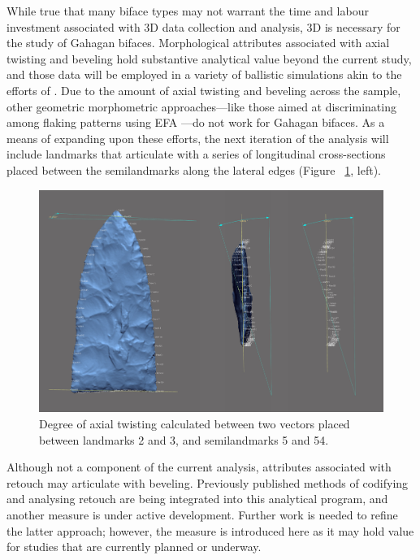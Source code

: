 \documentclass[review]{elsarticle}
\begin{document}
While true that many biface types may not warrant the time and labour investment associated with 3D data collection and analysis, 3D is necessary for the study of Gahagan bifaces. Morphological attributes associated with axial twisting and beveling hold substantive analytical value beyond the current study, and those data will be employed in a variety of ballistic simulations akin to the efforts of \citet{RN20857}. Due to the amount of axial twisting and beveling across the sample, other geometric morphometric approaches---like those aimed at discriminating among flaking patterns using EFA  \citep{RN253,RN4143,RN11975}---do not work for Gahagan bifaces. As a means of expanding upon these efforts, the next iteration of the analysis will include landmarks that articulate with a series of longitudinal cross-sections placed between the semilandmarks along the lateral edges (Figure ~\ref{fig:beveling}, left).

\begin{figure}[h]\centering
\includegraphics[width=\linewidth]{gahagan-beveling.pdf}
\caption{Degree of axial twisting calculated between two vectors placed between landmarks 2 and 3, and semilandmarks 5 and 54.}
\label{fig:beveling}
\end{figure}

Although not a component of the current analysis, attributes associated with retouch may articulate with beveling. Previously published methods of codifying and analysing retouch \citep{RN4308,RN3854} are being integrated into this analytical program, and another measure is under active development. Further work is needed to refine the latter approach; however, the measure is introduced here as it may hold value for studies that are currently planned or underway.
\end{document}
